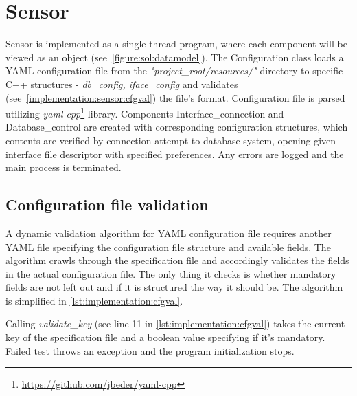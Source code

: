 \documentclass[12pt,a4paper,twoside]{report}
\begin{document}
	\section{Sensor} \label{implementation:sensor}
		Sensor is implemented as a single thread program, where each component will be viewed as an object (see~\autoref{figure:sol:datamodel}). The Configuration class loads a YAML configuration file from the \emph{"project\_root/resources/"} directory to specific C++ structures - \emph{db\_config, iface\_config} and validates (see~\autoref{implementation:sensor:cfgval}) the file's format. Configuration file is parsed utilizing \emph{yaml-cpp}\footnote{\url{https://github.com/jbeder/yaml-cpp}} library. Components Interface\_connection and Database\_control are created with corresponding configuration structures, which contents are verified by connection attempt to database system, opening given interface file descriptor with specified preferences. Any errors are logged and the main process is terminated.
		\subsection{Configuration file validation} \label{implementation:sensor:cfgval}
			A dynamic validation algorithm for YAML configuration file requires another YAML file specifying the configuration file structure and available fields. The algorithm crawls through the specification file and accordingly validates the fields in the actual configuration file. The only thing it checks is whether mandatory fields are not left out and if it is structured the way it should be. The algorithm is simplified in \autoref{lst:implementation:cfgval}.
			
			Calling \emph{validate\_key} (see line 11 in \autoref{lst:implementation:cfgval}) takes the current key of the specification file and a boolean value specifying if it's mandatory. Failed test throws an exception and the program initialization stops. 
\end{document}
